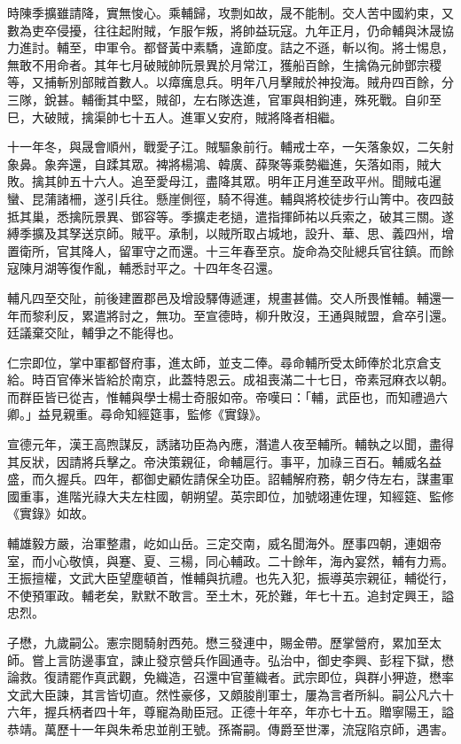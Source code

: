 \begin{pinyinscope}
時陳季擴雖請降，實無悛心。乘輔歸，攻剽如故，晟不能制。交人苦中國約束，又數為吏卒侵擾，往往起附賊，乍服乍叛，將帥益玩寇。九年正月，仍命輔與沐晟協力進討。輔至，申軍令。都督黃中素驕，違節度。詰之不遜，斬以徇。將士惕息，無敢不用命者。其年七月破賊帥阮景異於月常江，獲船百餘，生擒偽元帥鄧宗稷等，又捕斬別部賊首數人。以瘴癘息兵。明年八月擊賊於神投海。賊舟四百餘，分三隊，銳甚。輔衝其中堅，賊卻，左右隊迭進，官軍與相鉤連，殊死戰。自卯至巳，大破賊，擒渠帥七十五人。進軍乂安府，賊將降者相繼。

十一年冬，與晟會順州，戰愛子江。賊驅象前行。輔戒士卒，一矢落象奴，二矢射象鼻。象奔還，自蹂其眾。裨將楊鴻、韓廣、薛聚等乘勢繼進，矢落如雨，賊大敗。擒其帥五十六人。追至愛母江，盡降其眾。明年正月進至政平州。聞賊屯暹蠻、昆蒲諸柵，遂引兵往。懸崖側徑，騎不得進。輔與將校徒步行山箐中。夜四鼓抵其巢，悉擒阮景異、鄧容等。季擴走老撾，遣指揮師祐以兵索之，破其三關。遂縛季擴及其孥送京師。賊平。承制，以賊所取占城地，設升、華、思、義四州，增置衛所，官其降人，留軍守之而還。十三年春至京。旋命為交阯總兵官往鎮。而餘寇陳月湖等復作亂，輔悉討平之。十四年冬召還。

輔凡四至交阯，前後建置郡邑及增設驛傳遞運，規畫甚備。交人所畏惟輔。輔還一年而黎利反，累遣將討之，無功。至宣德時，柳升敗沒，王通與賊盟，倉卒引還。廷議棄交阯，輔爭之不能得也。

仁宗即位，掌中軍都督府事，進太師，並支二俸。尋命輔所受太師俸於北京倉支給。時百官俸米皆給於南京，此蓋特恩云。成祖喪滿二十七日，帝素冠麻衣以朝。而群臣皆已從吉，惟輔與學士楊士奇服如帝。帝嘆曰：「輔，武臣也，而知禮過六卿。」益見親重。尋命知經筵事，監修《實錄》。

宣德元年，漢王高煦謀反，誘諸功臣為內應，潛遣人夜至輔所。輔執之以聞，盡得其反狀，因請將兵擊之。帝決策親征，命輔扈行。事平，加祿三百石。輔威名益盛，而久握兵。四年，都御史顧佐請保全功臣。詔輔解府務，朝夕侍左右，謀畫軍國重事，進階光祿大夫左柱國，朝朔望。英宗即位，加號翊連佐理，知經筵、監修《實錄》如故。

輔雄毅方嚴，治軍整肅，屹如山岳。三定交南，威名聞海外。歷事四朝，連姻帝室，而小心敬慎，與蹇、夏、三楊，同心輔政。二十餘年，海內宴然，輔有力焉。王振擅權，文武大臣望塵頓首，惟輔與抗禮。也先入犯，振導英宗親征，輔從行，不使預軍政。輔老矣，默默不敢言。至土木，死於難，年七十五。追封定興王，謚忠烈。

子懋，九歲嗣公。憲宗閱騎射西苑。懋三發連中，賜金帶。歷掌營府，累加至太師。嘗上言防邊事宜，諫止發京營兵作圓通寺。弘治中，御史李興、彭程下獄，懋論救。復請罷作真武觀，免織造，召還中官董織者。武宗即位，與群小狎遊，懋率文武大臣諫，其言皆切直。然性豪侈，又頗朘削軍士，屢為言者所糾。嗣公凡六十六年，握兵柄者四十年，尊寵為勛臣冠。正德十年卒，年亦七十五。贈寧陽王，謚恭靖。萬歷十一年與朱希忠並削王號。孫崙嗣。傳爵至世澤，流寇陷京師，遇害。


\end{pinyinscope}
